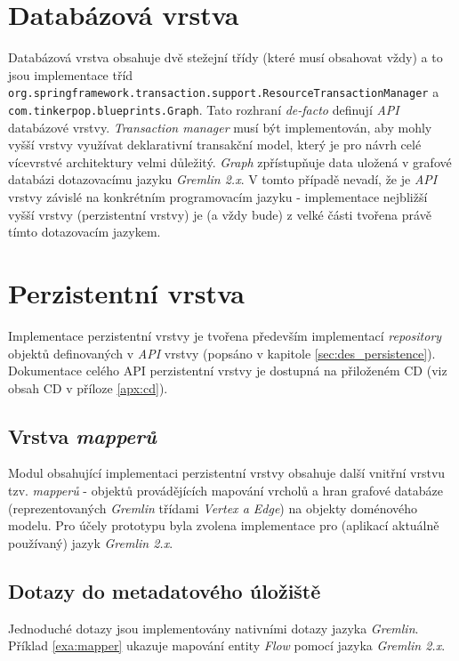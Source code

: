 \section{Databázová vrstva}
Databázová vrstva obsahuje dvě stežejní třídy (které musí obsahovat vždy) a to jsou implementace tříd \texttt{org.springframework.transaction.support.ResourceTransactionManager} a \texttt{com.tinkerpop.blueprints.Graph}. Tato rozhraní \textit{de-facto} definují \textit{API} databázové vrstvy. \textit{Transaction manager} musí být implementován, aby mohly vyšší vrstvy využívat deklarativní transakční model, který je pro návrh celé vícevrstvé architektury velmi důležitý. \textit{Graph} zpřístupňuje data uložená v grafové databázi dotazovacímu jazyku \textit{Gremlin 2.x}. V tomto případě nevadí, že je \textit{API} vrstvy závislé na konkrétním programovacím jazyku - implementace nejbližší vyšší vrstvy (perzistentní vrstvy) je (a vždy bude) z velké části tvořena právě tímto dotazovacím jazykem.    

\section{Perzistentní vrstva}
Implementace perzistentní vrstvy je tvořena především implementací \textit{repository} objektů definovaných v \textit{API} vrstvy (popsáno v kapitole \ref{sec:des_persistence}). Dokumentace celého API perzistentní vrstvy je dostupná na přiloženém CD (viz obsah CD v příloze \ref{apx:cd}).

\subsection{Vrstva \textit{mapperů}}
Modul obsahující implementaci perzistentní vrstvy obsahuje další vnitřní vrstvu tzv. \textit{mapperů} - objektů provádějících mapování vrcholů a hran grafové databáze (reprezentovaných \textit{Gremlin} třídami \textit{Vertex a Edge}) na objekty doménového modelu.  Pro účely prototypu byla zvolena implementace pro (aplikací aktuálně používaný) jazyk \textit{Gremlin 2.x}.

\subsection{Dotazy do metadatového úložiště}
Jednoduché dotazy jsou implementovány nativními dotazy jazyka \textit{Gremlin}. Příklad \ref{exa:mapper} ukazuje mapování entity \textit{Flow} pomocí jazyka \textit{Gremlin 2.x}.

